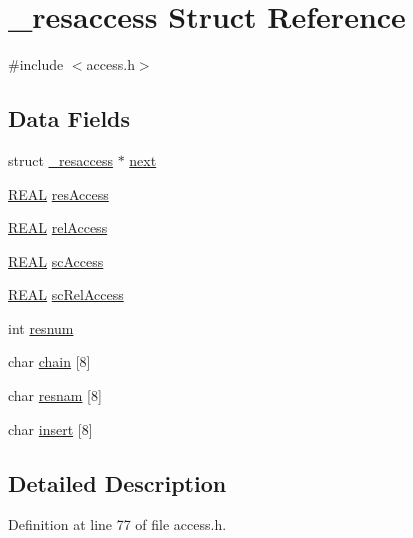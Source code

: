 \hypertarget{struct__resaccess}{\section{\-\_\-resaccess Struct Reference}
\label{struct__resaccess}
}


{\ttfamily \#include $<$access.\-h$>$}

\subsection*{Data Fields}
\begin{DoxyCompactItemize}
\item 
struct \hyperlink{struct__resaccess}{\-\_\-resaccess} $\ast$ \hyperlink{struct__resaccess_a295e27ff72673a8dbd47cc051ed0a77a}{next}
\item 
\hyperlink{_math_type_8h_a5821460e95a0800cf9f24c38915cbbde}{R\-E\-A\-L} \hyperlink{struct__resaccess_af58b3cff49ed17901e3cc61df9f9207f}{res\-Access}
\item 
\hyperlink{_math_type_8h_a5821460e95a0800cf9f24c38915cbbde}{R\-E\-A\-L} \hyperlink{struct__resaccess_a5b73edb2c84c56943d41dc814b7e7909}{rel\-Access}
\item 
\hyperlink{_math_type_8h_a5821460e95a0800cf9f24c38915cbbde}{R\-E\-A\-L} \hyperlink{struct__resaccess_aced9ce5dd04c016c644ebbfcd3c6f293}{sc\-Access}
\item 
\hyperlink{_math_type_8h_a5821460e95a0800cf9f24c38915cbbde}{R\-E\-A\-L} \hyperlink{struct__resaccess_ab5564a493ae6f3c763ad98226c8e5c58}{sc\-Rel\-Access}
\item 
int \hyperlink{struct__resaccess_a7503a437042b8ae030eefb90decd7ceb}{resnum}
\item 
char \hyperlink{struct__resaccess_a1e471e3ec9c79ebce4ec2e64d506ba8f}{chain} \mbox{[}8\mbox{]}
\item 
char \hyperlink{struct__resaccess_a6f47476bfe0dd0abc0ade4a21127dfc2}{resnam} \mbox{[}8\mbox{]}
\item 
char \hyperlink{struct__resaccess_a8cc72faf0908e6fff29637c614e608ed}{insert} \mbox{[}8\mbox{]}
\end{DoxyCompactItemize}


\subsection{Detailed Description}


Definition at line 77 of file access.\-h.



